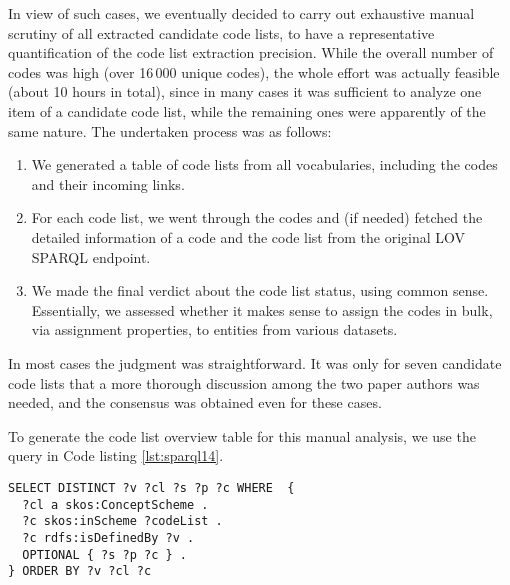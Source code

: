In view of such cases, we eventually decided to carry out exhaustive manual scrutiny of all extracted candidate code lists, to have a representative quantification of the code list extraction precision.
While the overall number of codes was high (over 16\,000 unique codes), the whole effort was actually feasible (about 10 hours in total), since in many cases it was sufficient to analyze one item of a candidate code list, while the remaining ones were apparently of the same nature.
The undertaken process was as follows:
\begin{enumerate}
    \item We generated a table of code lists from all vocabularies, including the codes and their incoming links.
    \item For each code list, we went through the codes
    and (if needed) fetched the detailed information of a code and the code list from the original LOV SPARQL endpoint.
    \item We made the final verdict about the code list status, using common sense. Essentially, we assessed whether it makes sense to assign the codes in bulk, via assignment properties, to entities from various datasets.  
\end{enumerate}
In most cases the judgment was straightforward. 
It was only for seven candidate code lists that a more thorough discussion among the two paper authors was needed, and the consensus was obtained even for these cases.

To generate the code list overview table for this manual analysis, we use the query in Code listing \ref{lst:sparql14}. %
\begin{lstlisting}[captionpos=b, caption=Query to generate a table overview of code lists including codes and their incoming links,label=lst:sparql14,basicstyle=\small\ttfamily,frame=single]
SELECT DISTINCT ?v ?cl ?s ?p ?c WHERE  {
  ?cl a skos:ConceptScheme .
  ?c skos:inScheme ?codeList .
  ?c rdfs:isDefinedBy ?v .
  OPTIONAL { ?s ?p ?c } .
} ORDER BY ?v ?cl ?c
\end{lstlisting}

